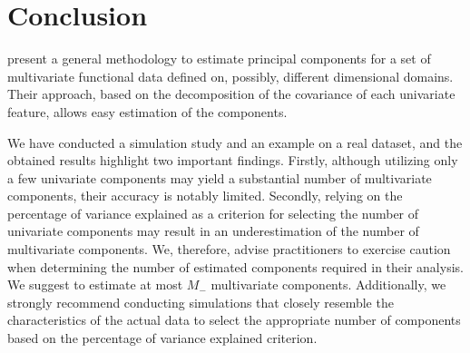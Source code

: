 
\section{Conclusion} %
\label{sec:conclusion}

\cite{happMultivariateFunctionalPrincipal2018} present a general methodology to estimate principal components for a set of multivariate functional data defined on, possibly, different dimensional domains. Their approach, based on the decomposition of the covariance of each univariate feature, allows easy estimation of the components.

We have conducted a simulation study and an example on a real dataset, and the obtained results highlight two important findings. Firstly, although utilizing only a few univariate components may yield a substantial number of multivariate components, their accuracy is notably limited. Secondly, relying on the percentage of variance explained as a criterion for selecting the number of univariate components may result in an underestimation of the number of multivariate components. We, therefore, advise practitioners to exercise caution when determining the number of estimated components required in their analysis. We suggest to estimate at most $M_{-}$ multivariate components. Additionally, we strongly recommend conducting simulations that closely resemble the characteristics of the actual data to select the appropriate number of components based on the percentage of variance explained criterion.






